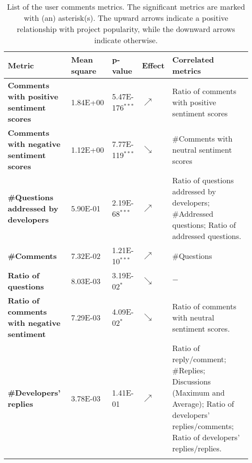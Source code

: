 \begin{table*}
	\vspace{-4.1cm}
	\centering
	\caption{List of the user comments metrics. The significant metrics are
	marked with (an) asterisk(s). The upward arrows indicate a positive
	relationship with project popularity, while the downward arrows
	indicate otherwise.\label{table:RQ2}}
	\scriptsize
	\tabcolsep=0.1cm
	\begin{tabularx}{\columnwidth}{>{\bfseries}L{0.21\columnwidth}R{0.15\columnwidth}R{0.2\columnwidth}C{0.1\columnwidth}L{0.26\columnwidth}}
		\toprule
		 {\bfseries Metric} & {\bfseries Mean square} & {\bfseries p-value} & {\bfseries Effect} & {\bfseries Correlated metrics}  \\
		\midrule
		Comments with positive sentiment scores & 1.84E+00 & 5.47E-176$^{\ast\ast\ast}$ & $\nearrow$ & Ratio of comments with positive sentiment scores \\
		\midrule
		Comments with negative sentiment scores & 1.12E+00 & 7.77E-119$^{\ast\ast\ast}$ & $\searrow$ & \#Comments with neutral sentiment scores\\ 
		\midrule
		\#Questions addressed by developers & 5.90E-01 & 2.19E-68$^{\ast\ast\ast}$  & $\nearrow$ & Ratio of questions addressed by developers; \#Addressed questions; Ratio of addressed questions. \\
		\midrule
		\#Comments & 7.32E-02 & 1.21E-10$^{\ast\ast\ast}$  & $\nearrow$ & \#Questions \\ 
		\midrule
		Ratio of questions  & 8.03E-03 & 3.19E-02$^{\ast}$ & $\searrow$ & $-$  \\ 
		\midrule
		Ratio of comments with negative sentiment & 7.29E-03 & 4.09E-02$^{\ast}$ & $\searrow$ & Ratio of comments with neutral sentiment scores. \\
		\midrule
		\#Developers' replies & 3.78E-03 & 1.41E-01 & $\nearrow$ & Ratio of reply/comment; \#Replies; Discussions (Maximum and Average); Ratio of developers' replies/comments; Ratio of developers' replies/replies.\\ 
		\bottomrule
		\\
	\end{tabularx}
\end{table*}
